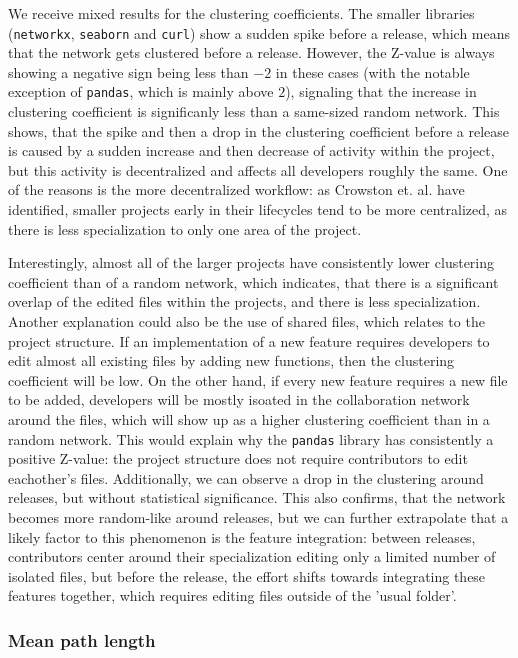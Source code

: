 We receive mixed results for the clustering coefficients. The smaller libraries (\texttt{networkx}, \texttt{seaborn} and \texttt{curl}) show a sudden spike before a release, which means that the network gets clustered before a release. However, the Z-value is always showing a negative sign being less than $-2$ in these cases (with the notable exception of \texttt{pandas}, which is mainly above $2$), signaling that the increase in clustering coefficient is significanly less than a same-sized random network. This shows, that the spike and then a drop in the clustering coefficient before a release is caused by a sudden increase and then decrease of activity within the project, but this activity is decentralized and affects all developers roughly the same. One of the reasons is the more decentralized workflow: as Crowston et. al. \cite{crowstonHierarchyCentralizationFree2006} have identified, smaller projects early in their lifecycles tend to be more centralized, as there is less specialization to only one area of the project.

Interestingly, almost all of the larger projects have consistently lower clustering coefficient than of a random network, which indicates, that there is a significant overlap of the edited files within the projects, and there is less specialization. Another explanation could also be the use of shared files, which relates to the project structure. If an implementation of a new feature requires developers to edit almost all existing files by adding new functions, then the clustering coefficient will be low. On the other hand, if every new feature requires a new file to be added, developers will be mostly isoated in the collaboration network around the files, which will show up as a higher clustering coefficient than in a random network. This would explain why the \texttt{pandas} library has consistently a positive Z-value: the project structure does not require contributors to edit eachother's files. Additionally, we can observe a drop in the clustering around releases, but without statistical significance. This also confirms, that the network becomes more random-like around releases, but we can further extrapolate that a likely factor to this phenomenon is the feature integration: between releases, contributors center around their specialization editing only a limited number of isolated files, but before the release, the effort shifts towards integrating these features together, which requires editing files outside of the 'usual folder'.

\subsubsection{Mean path length}

